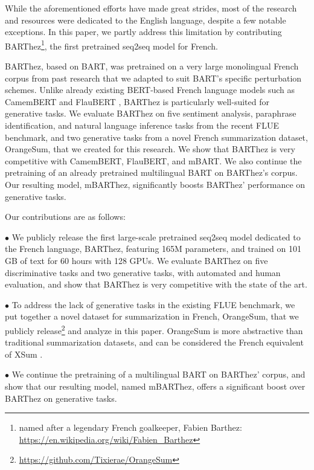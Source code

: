 \documentclass[11pt,a4paper]{article}
\begin{document}
While the aforementioned efforts have made great strides, most of the research and resources were dedicated to the English language, despite a few notable exceptions. In this paper, we partly address this limitation by contributing BARThez\footnote{named after a legendary French goalkeeper, Fabien Barthez: \tiny\url{ https://en.wikipedia.org/wiki/Fabien_Barthez}}, the first pretrained seq2seq model for French.

BARThez, based on BART, was pretrained on a very large monolingual French corpus from past research that we adapted to suit BART's specific perturbation schemes.
Unlike already existing BERT-based French language models such as CamemBERT \cite{martin2019camembert} and FlauBERT \cite{le2019flaubert}, BARThez is particularly well-suited for generative tasks.
We evaluate BARThez on five sentiment analysis, paraphrase identification, and natural language inference tasks from the recent FLUE benchmark, and two generative tasks from a novel French summarization dataset, OrangeSum, that we created for this research. 
We show that BARThez is very competitive with CamemBERT, FlauBERT, and mBART.
We also continue the pretraining of an already pretrained multilingual BART on BARThez's corpus.
Our resulting model, mBARThez, significantly boosts BARThez' performance on generative tasks.

Our contributions are as follows:

\noindent $\bullet$ We publicly release the first large-scale pretrained seq2seq model dedicated to the French language, BARThez, featuring 165M parameters, and trained on 101 GB of text for 60 hours with 128 GPUs.
We evaluate BARThez on five discriminative tasks and two generative tasks, with automated and human evaluation, and show that BARThez is very competitive with the state of the art.

\noindent $\bullet$ To address the lack of generative tasks in the existing FLUE benchmark, we put together a novel dataset for summarization in French, OrangeSum, that we publicly release\footnote{\tiny \url{https://github.com/Tixierae/OrangeSum}} and analyze in this paper.
OrangeSum is more abstractive than traditional summarization datasets, and can be considered the French equivalent of XSum \cite{narayan2018don}.

\noindent $\bullet$ We continue the pretraining of a multilingual BART on BARThez' corpus, and show that
our resulting model, named mBARThez, offers a significant boost over BARThez on generative tasks.
\end{document}
